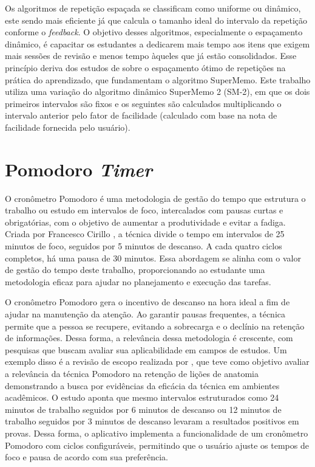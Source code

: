 Os algoritmos de repetição espaçada se classificam como uniforme ou dinâmico, este sendo mais eficiente já que calcula o tamanho ideal do intervalo da repetição conforme o \textit{feedback}.
O objetivo desses algoritmos, especialmente o espaçamento dinâmico, é capacitar os estudantes a dedicarem mais tempo aos itens que exigem mais sessões de revisão e menos tempo àqueles que já estão consolidados.
Esse princípio deriva dos estudos de  sobre o espaçamento ótimo de repetições na prática do aprendizado, que fundamentam o algoritmo SuperMemo.
Este trabalho utiliza uma variação do algoritmo dinâmico SuperMemo 2 (SM-2), em que os dois primeiros intervalos são fixos e os seguintes são calculados multiplicando o intervalo anterior pelo fator de facilidade (calculado com base na nota de facilidade fornecida pelo usuário).

\section{Pomodoro \textit{Timer}}

O  cronômetro Pomodoro é uma metodologia de gestão do tempo que estrutura o trabalho ou estudo em intervalos de foco, intercalados com pausas curtas e obrigatórias, com o objetivo de aumentar a produtividade e evitar a fadiga.
Criada por Francesco Cirillo \cite{cirillo_2018}, a técnica divide o tempo em intervalos de 25 minutos de foco, seguidos por 5 minutos de descanso.
A cada quatro ciclos completos, há uma pausa de 30 minutos.
Essa abordagem se alinha com o valor de gestão do tempo deste trabalho, proporcionando ao estudante uma metodologia eficaz para ajudar no planejamento e execução das tarefas.

O cronômetro Pomodoro gera o incentivo de descanso na hora ideal a fim de ajudar na manutenção da atenção.
Ao garantir pausas frequentes, a técnica permite que a pessoa se recupere, evitando a sobrecarga e o declínio na retenção de informações.
Dessa forma, a relevância dessa metodologia é crescente, com pesquisas que buscam avaliar sua aplicabilidade em campos de estudos.
Um exemplo disso é a revisão de escopo realizada por , que teve como objetivo avaliar a relevância da técnica Pomodoro na retenção de lições de anatomia demonstrando a busca por evidências da eficácia da técnica em ambientes acadêmicos.
O estudo aponta que mesmo intervalos estruturados como 24 minutos de trabalho seguidos por 6 minutos de descanso ou 12 minutos de trabalho seguidos por 3 minutos de descanso levaram a resultados positivos em provas.
Dessa forma, o aplicativo implementa a funcionalidade de um cronômetro Pomodoro com ciclos configuráveis, permitindo que o usuário ajuste os tempos de foco e pausa de acordo com sua preferência.

